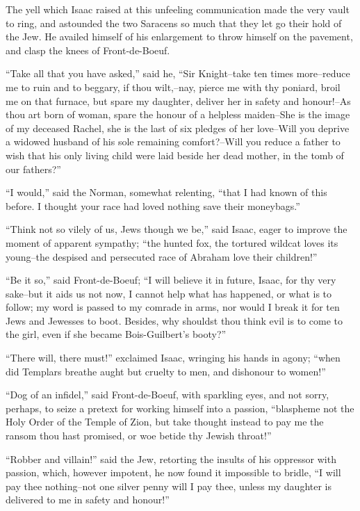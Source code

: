 The yell which Isaac raised at this unfeeling communication made the
very vault to ring, and astounded the two Saracens so much that they let
go their hold of the Jew. He availed himself of his enlargement to throw
himself on the pavement, and clasp the knees of Front-de-Boeuf.

``Take all that you have asked,'' said he, ``Sir Knight--take ten times
more--reduce me to ruin and to beggary, if thou wilt,--nay, pierce me
with thy poniard, broil me on that furnace, but spare my daughter,
deliver her in safety and honour!--As thou art born of woman, spare the
honour of a helpless maiden--She is the image of my deceased Rachel, she
is the last of six pledges of her love--Will you deprive a widowed
husband of his sole remaining comfort?--Will you reduce a father to wish
that his only living child were laid beside her dead mother, in the tomb
of our fathers?''

``I would,'' said the Norman, somewhat relenting, ``that I had known of
this before. I thought your race had loved nothing save their
moneybags.''

``Think not so vilely of us, Jews though we be,'' said Isaac, eager to
improve the moment of apparent sympathy; ``the hunted fox, the tortured
wildcat loves its young--the despised and persecuted race of Abraham
love their children!''

``Be it so,'' said Front-de-Boeuf; ``I will believe it in future, Isaac,
for thy very sake--but it aids us not now, I cannot help what has
happened, or what is to follow; my word is passed to my comrade in arms,
nor would I break it for ten Jews and Jewesses to boot. Besides, why
shouldst thou think evil is to come to the girl, even if she became
Bois-Guilbert's booty?''

``There will, there must!'' exclaimed Isaac, wringing his hands in
agony; ``when did Templars breathe aught but cruelty to men, and
dishonour to women!''

``Dog of an infidel,'' said Front-de-Boeuf, with sparkling eyes, and not
sorry, perhaps, to seize a pretext for working himself into a passion,
``blaspheme not the Holy Order of the Temple of Zion, but take thought
instead to pay me the ransom thou hast promised, or woe betide thy
Jewish throat!''

``Robber and villain!'' said the Jew, retorting the insults of his
oppressor with passion, which, however impotent, he now found it
impossible to bridle, ``I will pay thee nothing--not one silver penny
will I pay thee, unless my daughter is delivered to me in safety and
honour!''

